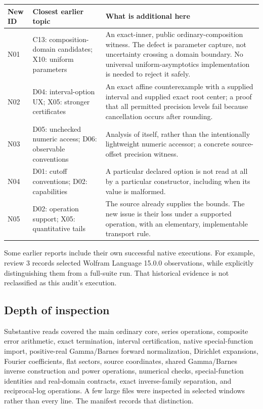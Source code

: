 \documentclass[11pt,a4paper]{article}
\newcommand{\code}[1]{\texttt{\detokenize{#1}}}
\begin{document}
\begin{longtable}{@{}L{11mm}L{43mm}L{103mm}@{}}
\toprule New ID & Closest earlier topic & What is additional here\\\midrule\endhead
N01 & C13: composition-domain candidates; X10: uniform parameters & An exact-inner, public ordinary-composition witness. The defect is parameter capture, not uncertainty crossing a domain boundary. No universal uniform-asymptotics implementation is needed to reject it safely.\\
N02 & D04: interval-option UX; X05: stronger certificates & An exact affine counterexample with a supplied interval and supplied exact root center; a proof that all permitted precision levels fail because cancellation occurs after rounding.\\
N03 & D05: unchecked numeric access; D06: observable conventions & Analysis of \code{InverseNumericalCheck} itself, rather than the intentionally lightweight numeric accessor; a concrete source-offset precision witness.\\
N04 & D01: cutoff conventions; D02: capabilities & A particular declared option is not read at all by a particular constructor, including when its value is malformed.\\
N05 & D02: operation support; X05: quantitative tails & The source already supplies the bounds. The new issue is their loss under a supported operation, with an elementary, implementable transport rule.\\
\bottomrule
\end{longtable}

Some earlier reports include their own successful native executions. For example, review 3 records selected Wolfram Language 15.0.0 observations, while explicitly distinguishing them from a full-suite run. That historical evidence is not reclassified as this audit's execution.\cite{review3}

\subsection{Depth of inspection}

Substantive reads covered the main ordinary core, series operations, composite error arithmetic, exact termination, interval certification, native special-function import, positive-real Gamma/Barnes forward normalization, Dirichlet expansions, Fourier coefficients, flat sectors, source coordinates, shared Gamma/Barnes inverse construction and power operations, numerical checks, special-function identities and real-domain contracts, exact inverse-family separation, and reciprocal-log operations. A few large files were inspected in selected windows rather than every line. The manifest records that distinction.\cite{core,operations,envelopes,native,gamma-forward,barnes-forward,dirichlet,fourier,flat,source-coordinates,gamma,gamma-power,gamma-checks,identities,real-domain,families,reciprocal}
\end{document}
